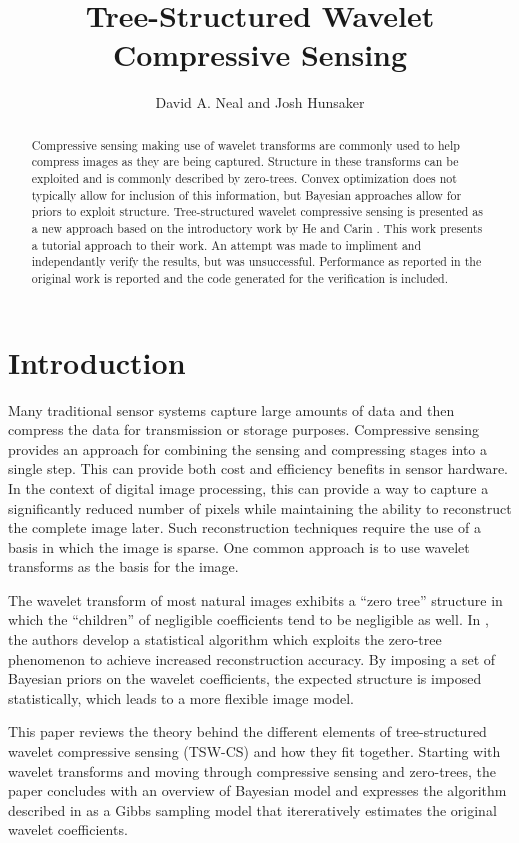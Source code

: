 \documentclass{IEEEtran}
\title{Tree-Structured Wavelet Compressive Sensing}
\author{David A. Neal and Josh Hunsaker}
\begin{document}
\maketitle

\begin{abstract}
Compressive sensing making use of wavelet transforms are commonly used
to help compress images as they are being captured.  Structure in
these transforms can be exploited and is commonly described by
zero-trees.  Convex optimization does not typically allow for
inclusion of this information, but Bayesian approaches allow for
priors to exploit structure.  Tree-structured wavelet compressive
sensing is presented as a new approach based on the introductory work
by He and Carin \cite{He09}.  This work presents a tutorial approach
to their work.  An attempt was made to impliment and
independantly verify the results, but was unsuccessful.  Performance
as reported in the original work is reported and the code generated
for the verification is included. 
\end{abstract}

\section{Introduction}

Many traditional sensor systems capture large amounts of data and then compress the data for transmission or storage purposes.  Compressive sensing provides an approach for combining the sensing and compressing stages into a single step.  This can provide both cost and efficiency benefits in sensor hardware. In the context of digital image processing, this can provide a way to capture a significantly reduced number of pixels while maintaining the ability to reconstruct the complete image later. Such reconstruction techniques require the use of a basis in which the image is sparse. One common approach is to use wavelet transforms as the basis for the image.

The wavelet transform of most natural images exhibits a ``zero tree''
structure in which the ``children'' of negligible coefficients tend to
be negligible as well. In \cite{He09}, the authors develop a
statistical algorithm which exploits the zero-tree phenomenon to
achieve increased reconstruction accuracy. By imposing a set of
Bayesian priors on the wavelet coefficients, the expected structure is
imposed statistically, which leads to a more flexible image model.

This paper reviews the theory behind the different elements of tree-structured wavelet
compressive sensing (TSW-CS) and how they fit together.  Starting with
wavelet transforms and moving through compressive sensing and
zero-trees, the paper concludes with an overview of Bayesian model and
expresses the algorithm described in \cite{He09} as a Gibbs sampling
model that itereratively estimates the original wavelet coefficients.
\end{document}
